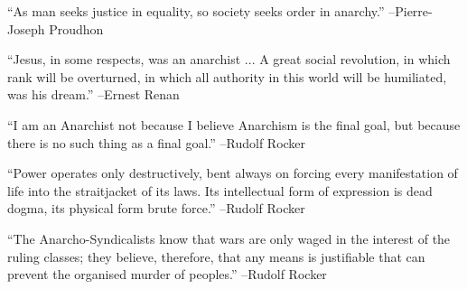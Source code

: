 \documentclass{article}%
\begin{document}
\linebreak%
\vspace{1mm}%
\begin{minipage}{\textwidth}%
\flushleft%
“As man seeks justice in equality, so society seeks order in anarchy.”%
\linebreak%
\vspace{1mm}%
–Pierre{-}Joseph Proudhon%
\linebreak%
\vspace{1mm}%
\end{minipage}%
\linebreak%
\vspace{1mm}%
\begin{minipage}{\textwidth}%
\flushleft%
“Jesus, in some respects, was an anarchist ... A great social revolution, in which rank will be overturned, in which all authority in this world will be humiliated, was his dream.”%
\linebreak%
\vspace{1mm}%
–Ernest Renan%
\linebreak%
\vspace{1mm}%
\end{minipage}%
\linebreak%
\vspace{1mm}%
\begin{minipage}{\textwidth}%
\flushleft%
“I am an Anarchist not because I believe Anarchism is the final goal, but because there is no such thing as a final goal.”%
\linebreak%
\vspace{1mm}%
–Rudolf Rocker%
\linebreak%
\vspace{1mm}%
\end{minipage}%
\linebreak%
\vspace{1mm}%
\begin{minipage}{\textwidth}%
\flushleft%
“Power operates only destructively, bent always on forcing every manifestation of life into the straitjacket of its laws. Its intellectual form of expression is dead dogma, its physical form brute force.”%
\linebreak%
\vspace{1mm}%
–Rudolf Rocker%
\linebreak%
\vspace{1mm}%
\end{minipage}%
\linebreak%
\vspace{1mm}%
\begin{minipage}{\textwidth}%
\flushleft%
“The Anarcho{-}Syndicalists know that wars are only waged in the interest of the ruling classes; they believe, therefore, that any means is justifiable that can prevent the organised murder of peoples.”%
\linebreak%
\vspace{1mm}%
–Rudolf Rocker%
\linebreak%
\vspace{1mm}%
\end{minipage}%
\end{document}
